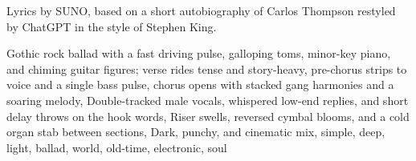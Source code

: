 
\begin{notes}
Lyrics by SUNO, based on a short autobiography of Carlos Thompson restyled by ChatGPT in the style of Stephen King.
\end{notes}
\begin{style}
Gothic rock ballad with a fast driving pulse, galloping toms, minor-key piano, and chiming guitar figures; verse rides tense and story-heavy, pre-chorus strips to voice and a single bass pulse, chorus opens with stacked gang harmonies and a soaring melody, Double-tracked male vocals, whispered low-end replies, and short delay throws on the hook words, Riser swells, reversed cymbal blooms, and a cold organ stab between sections, Dark, punchy, and cinematic mix, simple, deep, light, ballad, world, old-time, electronic, soul
\end{style}
